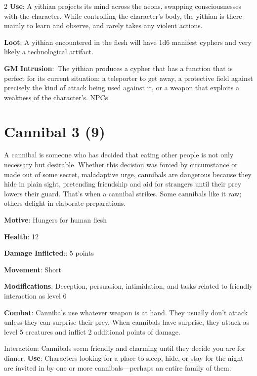 \begin{multicols}{2}
\textbf{Use}: A yithian projects its mind across the aeons, swapping consciousnesses with the character. While controlling the character’s body, the yithian is there mainly to learn and observe, and rarely takes any violent actions.

\textbf{Loot}: A yithian encountered in the flesh will have 1d6 manifest cyphers and very likely a technological artifact.

\textbf{GM Intrusion}: The yithian produces a cypher that has a function that is perfect for its current situation: a teleporter to get away, a protective field against precisely the kind of attack being used against it, or a weapon that exploits a weakness of the character’s.
NPCs 

\section{Cannibal 3 (9)}

A cannibal is someone who has decided that eating other people is not only necessary but desirable. Whether this decision was forced by circumstance or made out of some secret, maladaptive urge, cannibals are dangerous because they hide in plain sight, pretending friendship and aid for strangers until their prey lowers their guard. That’s when a cannibal strikes. Some cannibals like it raw; others delight in elaborate preparations.

\textbf{Motive}: Hungers for human flesh 

\textbf{Health}: 12

\textbf{Damage Inflicted}:: 5 points 

\textbf{Movement}: Short

\textbf{Modifications}: Deception, persuasion, intimidation, and tasks related to friendly interaction as level 6

\textbf{Combat}: Cannibals use whatever weapon is at hand. They usually don’t attack unless they can surprise their prey. When cannibals have surprise, they attack as level 5 creatures and inflict 2 additional points of damage.

Interaction: Cannibals seem friendly and charming until they decide you are for dinner. \textbf{Use}: Characters looking for a place to sleep, hide, or stay for the night are invited in by one or more cannibals—perhaps an entire family of them.


\end{multicols}
